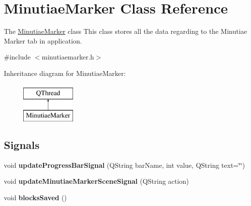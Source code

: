 \hypertarget{class_minutiae_marker}{}\section{Minutiae\+Marker Class Reference}
\label{class_minutiae_marker}


The \mbox{\hyperlink{class_minutiae_marker}{Minutiae\+Marker}} class This class stores all the data regarding to the Minutiae Marker tab in application.  




{\ttfamily \#include $<$minutiaemarker.\+h$>$}

Inheritance diagram for Minutiae\+Marker\+:\begin{figure}[H]
\begin{center}
\leavevmode
\includegraphics[height=2.000000cm]{class_minutiae_marker}
\end{center}
\end{figure}
\subsection*{Signals}
\begin{DoxyCompactItemize}
\item 
\mbox{\label{class_minutiae_marker_a9f56610c2aa29546a241635b411c88c2}} 
void {\bfseries update\+Progress\+Bar\+Signal} (Q\+String bar\+Name, int value, Q\+String text=\char`\"{}\char`\"{})
\item 
\mbox{\label{class_minutiae_marker_aec4e7268ee8f6c17b6ae226955934672}} 
void {\bfseries update\+Minutiae\+Marker\+Scene\+Signal} (Q\+String action)
\item 
\mbox{\label{class_minutiae_marker_a8fca3a804d470a97275bc7069183b6a0}} 
void {\bfseries blocks\+Saved} ()
\end{DoxyCompactItemize}

